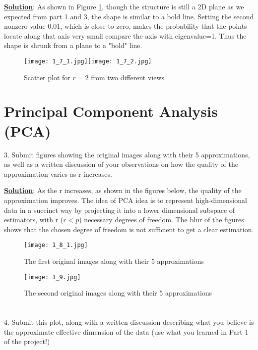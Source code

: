 \documentclass[12pt, letterpaper]{article}
\begin{document}
\noindent
\textbf{\underline{Solution}}: As shown in Figure \ref{fig:1_7}, though the structure is still a 2D plane as we expected from part 1 and 3, the shape is similar to a bold line. Setting the second nonzero value 0.01, which is close to zero, makes the probability that the points locate along that axis very small compare the axis with eigenvalue=1. Thus the shape is shrunk from a plane to a "bold" line.

\begin{figure}[h]
  \centering
  \texttt{[image: 1\_7\_1.jpg]}\texttt{[image: 1\_7\_2.jpg]}
  \caption{Scatter plot for $r=2$ from two different views}
  \label{fig:1_7}
\end{figure}


\section{Principal Component Analysis (PCA)}
3. Submit figures showing the original images along with their 5 approximations, as well as a written discussion of your observations on how the quality of the approximation varies as r increases.

\noindent
\textbf{\underline{Solution}}: As the r increases, as shown in the figures below, the quality of the approximation improves. The idea of PCA idea is to represent high-dimensional data in a succinct way by projecting it into a lower dimensional subspace of estimators, with r ($r<p$) necessary degrees of freedom. The blur of the figures shows that the chosen degree of freedom is not sufficient to get a clear estimation.

\begin{figure}[h]
  \centering
  \texttt{[image: 1\_8\_1.jpg]}
  \caption{The first original images along with their 5 approximations}
  \label{fig:1_8}
\end{figure}

\begin{figure}[h]
  \centering
  \texttt{[image: 1\_9.jpg]}
  \caption{The second original images along with their 5 approximations}
  \label{fig:1_9}
\end{figure}

\section*{}
4. Submit this plot, along with a written discussion describing what you believe is the approximate effective dimension of the data (use what you learned in Part 1 of the project!)
\end{document}
